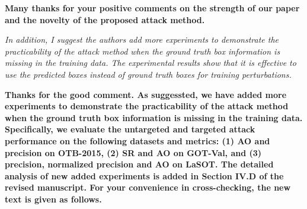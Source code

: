 \documentclass[12pt]{article}
\begin{document}
\textbf{Many thanks for your positive comments on the strength of our paper and the novelty of the proposed attack method.}

\textit{In addition, I suggest the authors add more experiments to demonstrate the practicability of the attack method when the ground truth box information is missing in the training data. The experimental results show that it is effective to use the predicted boxes instead of ground truth boxes for training perturbations.}

\textbf{Thanks for the good comment. As suggessted, we have added more experiments to demonstrate the practicability of the attack method when the ground truth box information is missing in the training data. Specifically, we evaluate the untargeted and targeted attack performance on the following datasets and metrics: (1) AO and precision on OTB-2015, (2) SR and AO on GOT-Val, and (3) precision, normalized precision and AO on LaSOT.
The detailed analysis of new added experiments is added in Section IV.D of the revised manuscript. For your convenience in cross-checking, the new text is given as follows.}
\end{document}
